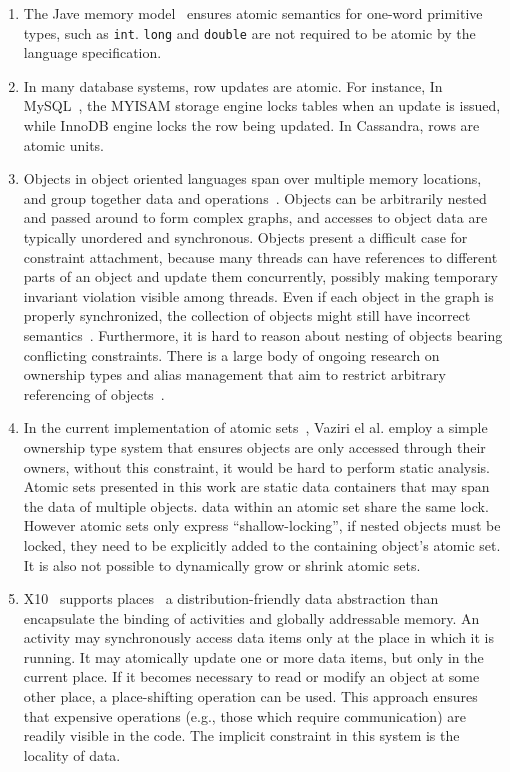 \documentclass[]{usiinfprospectus}
\begin{document}
\begin{enumerate}
	\item The Jave memory model~\cite{javamemorymodel} ensures atomic semantics for one-word primitive types, such as \texttt{int}. \texttt{long} and \texttt{double} are not required to be atomic by the language specification.  
	\item In many database systems, row updates are atomic. For instance, In MySQL~\cite{mysql}, the MYISAM storage engine locks tables when an update is issued, while InnoDB engine locks the row being updated. In Cassandra, rows are atomic units. 
	\item Objects in object oriented languages span over multiple memory locations, and group together data and operations~\cite{rentsch1982object}. Objects can be arbitrarily nested and passed around to form complex graphs, and accesses to object data are typically unordered and synchronous. Objects present a difficult case for constraint attachment, because many threads can have references to different parts of an object and update them concurrently, possibly making temporary invariant violation visible among threads. Even if each object in the graph is properly synchronized, the collection of objects might still have incorrect semantics~\cite{artho2003high}.  Furthermore, it is hard to reason about nesting of objects bearing conflicting constraints. There is a large body of ongoing research on ownership types and alias management that aim to restrict arbitrary referencing of objects~\cite{muller1999universes, clarke2008minimal, haller2010capabilities}.
	\item In the current implementation of atomic sets~\cite{dolby2012data}, Vaziri el al. employ a simple ownership type system that ensures objects are only accessed through their owners, without this constraint, it would be hard to perform static analysis. Atomic sets presented in this work are static data containers that may span the data of multiple objects. data within an atomic set share the same lock. However atomic sets only express ``shallow-locking'', if nested objects must be locked, they need to be explicitly added to the containing object's atomic set. It is also not possible to dynamically grow or shrink atomic sets. 
	\item X10~\cite{charles2005x10} supports places~\cite{x10spec}  a distribution-friendly data abstraction than encapsulate the binding of activities and globally addressable memory. An activity may synchronously access data items only at the place in which it is running. It may atomically update one or more data items, but only in the current place. If it becomes necessary to read or modify an object at some other place, a place-shifting operation can be used. This approach ensures that expensive operations (e.g., those which require communication) are readily visible in the code. The implicit constraint in this system is the locality of data. 

\end{enumerate}
\end{document}
